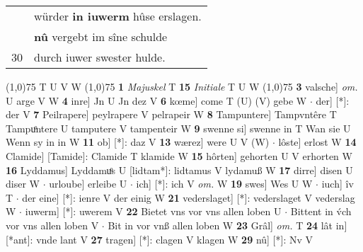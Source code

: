 \documentclass[8pt,a4paper,notitlepage]{article}
\begin{document}
\begin{table}[ht]
\begin{minipage}[t]{0.5\linewidth}
\begin{tabular}{rl}
 & würder \textbf{in iuwerm} hûse erslagen.\\ 
 & \textbf{nû} vergebt im sîne schulde\\ 
30 & durch iuwer swester hulde.\\ 
\end{tabular}
\scriptsize
\line(1,0){75} \newline
T U V W \newline
\line(1,0){75} \newline
\textbf{1} \textit{Majuskel} T  \textbf{15} \textit{Initiale} T U W  \newline
\line(1,0){75} \newline
\textbf{3} valsche] \textit{om.} U arge V W \textbf{4} inre] Jn U Jn dez V \textbf{6} kœme] come T (U) (V) gebe W  $\cdot$ der] [*]: der V \textbf{7} Peilrapere] peylrapere V pelrapeir W \textbf{8} Tampuntere] Tampvntêre T Tampuͦntere U tamputere V tampenteir W \textbf{9} swenne si] swenne in T Wan sie U Wenn sy in in W \textbf{11} ob] [*]: daz V \textbf{13} wærez] were U V (W)  $\cdot$ lôste] erlost W \textbf{14} Clamide] [Tamide]: Clamide T klamide W \textbf{15} hôrten] gehorten U V erhorten W \textbf{16} Lyddamus] Lyddamuͦs U [lidtam*]: lidtamus V lydamuß W \textbf{17} dirre] disen U diser W  $\cdot$ urloube] erleibe U  $\cdot$ ich] [*]: ich V \textit{om.} W \textbf{19} swes] Wes U W  $\cdot$ iuch] îv T  $\cdot$ der eine] [*]: ienre V der einig W \textbf{21} vederslaget] [*]: vederslaget V vederslag W  $\cdot$ iuwerm] [*]: uwerem V \textbf{22} Bietet vns vor vns allen loben U  $\cdot$ Bittent in v́ch vor vns allen loben V  $\cdot$ Bit in vor vnß allen loben W \textbf{23} Grâl] \textit{om.} T \textbf{24} lât in] [*ant]: vnde lant V \textbf{27} tragen] [*]: clagen V klagen W \textbf{29} nû] [*]: Nv V \newline
\end{minipage}
\end{table}
\end{document}
